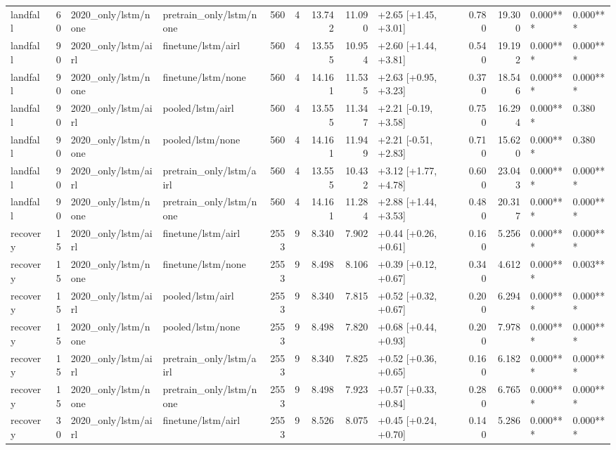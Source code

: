 \begin{tabular}{lrllrrrrlrrll}
landfall & 60 & 2020_only/lstm/none & pretrain_only/lstm/none & 560 & 4 & 13.742 & 11.090 & +2.65 [+1.45, +3.01] & 0.780 & 19.300 & 0.000*** & 0.000*** \\
landfall & 90 & 2020_only/lstm/airl & finetune/lstm/airl & 560 & 4 & 13.555 & 10.954 & +2.60 [+1.44, +3.81] & 0.540 & 19.192 & 0.000*** & 0.000*** \\
landfall & 90 & 2020_only/lstm/none & finetune/lstm/none & 560 & 4 & 14.161 & 11.535 & +2.63 [+0.95, +3.23] & 0.370 & 18.546 & 0.000*** & 0.000*** \\
landfall & 90 & 2020_only/lstm/airl & pooled/lstm/airl & 560 & 4 & 13.555 & 11.347 & +2.21 [-0.19, +3.58] & 0.750 & 16.294 & 0.000*** & 0.380 \\
landfall & 90 & 2020_only/lstm/none & pooled/lstm/none & 560 & 4 & 14.161 & 11.949 & +2.21 [-0.51, +2.83] & 0.710 & 15.620 & 0.000*** & 0.380 \\
landfall & 90 & 2020_only/lstm/airl & pretrain_only/lstm/airl & 560 & 4 & 13.555 & 10.432 & +3.12 [+1.77, +4.78] & 0.600 & 23.043 & 0.000*** & 0.000*** \\
landfall & 90 & 2020_only/lstm/none & pretrain_only/lstm/none & 560 & 4 & 14.161 & 11.284 & +2.88 [+1.44, +3.53] & 0.480 & 20.317 & 0.000*** & 0.000*** \\
recovery & 15 & 2020_only/lstm/airl & finetune/lstm/airl & 2553 & 9 & 8.340 & 7.902 & +0.44 [+0.26, +0.61] & 0.160 & 5.256 & 0.000*** & 0.000*** \\
recovery & 15 & 2020_only/lstm/none & finetune/lstm/none & 2553 & 9 & 8.498 & 8.106 & +0.39 [+0.12, +0.67] & 0.340 & 4.612 & 0.000*** & 0.003** \\
recovery & 15 & 2020_only/lstm/airl & pooled/lstm/airl & 2553 & 9 & 8.340 & 7.815 & +0.52 [+0.32, +0.67] & 0.200 & 6.294 & 0.000*** & 0.000*** \\
recovery & 15 & 2020_only/lstm/none & pooled/lstm/none & 2553 & 9 & 8.498 & 7.820 & +0.68 [+0.44, +0.93] & 0.200 & 7.978 & 0.000*** & 0.000*** \\
recovery & 15 & 2020_only/lstm/airl & pretrain_only/lstm/airl & 2553 & 9 & 8.340 & 7.825 & +0.52 [+0.36, +0.65] & 0.160 & 6.182 & 0.000*** & 0.000*** \\
recovery & 15 & 2020_only/lstm/none & pretrain_only/lstm/none & 2553 & 9 & 8.498 & 7.923 & +0.57 [+0.33, +0.84] & 0.280 & 6.765 & 0.000*** & 0.000*** \\
recovery & 30 & 2020_only/lstm/airl & finetune/lstm/airl & 2553 & 9 & 8.526 & 8.075 & +0.45 [+0.24, +0.70] & 0.140 & 5.286 & 0.000*** & 0.000*** \\

\end{tabular}
